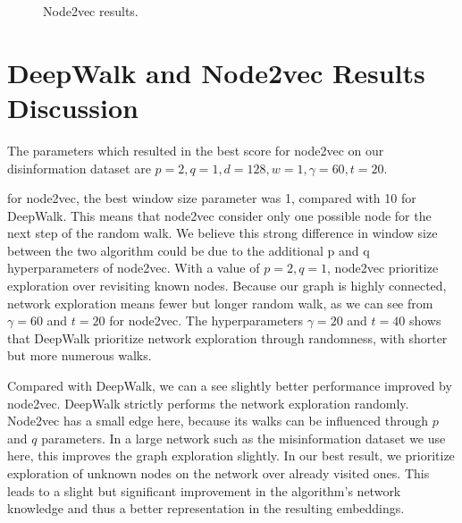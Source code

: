 \begin{figure}[h]
    \centering
    \begin{subfigure}[b]{0.49\textwidth}
        \centering
        \scalebox{.5}{}
        \label{fig:node2vec:representation and window size}
    \end{subfigure}
    \hfill
    \begin{subfigure}[b]{0.49\textwidth}
        \centering
        \scalebox{.5}{}
        \label{fig:node2vec:number and walk length}
    \end{subfigure}
    \caption{Node2vec results.}
    \label{fig:deepwalk:plots}
\end{figure}

\section{DeepWalk and Node2vec Results Discussion}
The parameters which resulted in the best score for node2vec on our disinformation dataset are $p=2, q=1, d=128, w=1, \gamma=60,t=20 $.

for node2vec, the best window size parameter was 1, compared with 10 for DeepWalk.
This means that node2vec consider only one possible node for the next step of the random walk.
We believe this strong difference in window size between the two algorithm could be due to the additional p and q hyperparameters of node2vec.
With a value of $p=2, q=1$, node2vec prioritize exploration over revisiting known nodes.
Because our graph is highly connected, network exploration means fewer but longer random walk, as we can see from $\gamma=60$ and $t=20$ for node2vec.
The hyperparameters $\gamma=20$ and $t=40$ shows that DeepWalk prioritize network exploration through randomness, with shorter but more numerous walks.

Compared with DeepWalk, we can a see slightly better performance improved by node2vec.
DeepWalk strictly performs the network exploration randomly. 
Node2vec has a small edge here, because its walks can be influenced through $p$ and $q$ parameters.
In a large network such as the misinformation dataset we use here, this improves the graph exploration slightly.
In our best result, we prioritize exploration of unknown nodes on the network over already visited ones.
This leads to a slight but significant improvement in the algorithm's network knowledge and thus a better representation in the resulting embeddings. 

